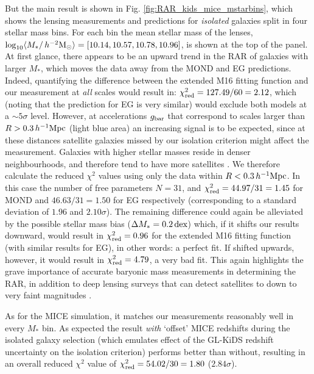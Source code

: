 \documentclass[usenatbib]{mnras}
\newcommand{\hmsun}{\,h^{-2} {\rm M_\odot}}
\newcommand{\hMpc}{\, h^{-1}{\rm{Mpc}} }
\newcommand{\lan}{\langle}
\newcommand{\ran}{\rangle}
\newcommand{\un}[1]{_{\rm #1}}
\newcommand{\dex}{\, {\rm dex}}
\begin{document}
But the main result is shown in Fig. \ref{fig:RAR_kids_mice_mstarbins}, which shows the lensing measurements and predictions for \emph{isolated} galaxies split in four stellar mass bins. For each bin the mean stellar mass of the lenses, $\log_{10}\lan M_*/\hmsun \ran = [10.14, 10.57, 10.78, 10.96]$, is shown at the top of the panel. At first glance, there appears to be an upward trend in the RAR of galaxies with larger $M_*$, which moves the data away from the MOND and EG predictions. Indeed, quantifying the difference between the extended M16 fitting function and our measurement at \emph{all} scales would result in: $\chi\un{red}^2 = 127.49 / 60 = 2.12$, which (noting that the prediction for EG is very similar) would exclude both models at a $\sim5 \sigma$ level. However, at accelerations $g\un{bar}$ that correspond to scales larger than $R > 0.3 \hMpc$ (light blue area) an increasing signal is to be expected, since at these distances satellite galaxies missed by our isolation criterion might affect the measurement. Galaxies with higher stellar masses reside in denser neighbourhoods, and therefore tend to have more satellites \cite[see e.g.]{baldry2006, bolzonella2010, brouwer2016}. We therefore calculate the reduced $\chi^2$ values using only the data within $R < 0.3 \hMpc$. In this case the number of free parameters $N = 31$, and $\chi\un{red}^2 = 44.97 / 31 = 1.45$ for MOND and $46.63 / 31 = 1.50$ for EG respectively (corresponding to a standard deviation of $1.96$ and $2.10\sigma$). The remaining difference could again be alleviated by the possible stellar mass bias ($\Delta M_* = 0.2 \dex$) which, if it shifts our results downward, would result in $\chi\un{red}^2 = 0.96$ for the extended M16 fitting function (with similar results for EG), in other words: a perfect fit. If shifted upwards, however, it would result in $\chi\un{red}^2=4.79$, a very bad fit. This again highlights the grave importance of accurate baryonic mass measurements in determining the RAR, in addition to deep lensing surveys that can detect satellites to down to very faint magnitudes \cite[such as the future Euclid survey;][]{laureijs2011}.

As for the MICE simulation, it matches our measurements reasonably well in every $M_*$ bin. As expected the result \emph{with} `offset' MICE redshifts during the isolated galaxy selection (which emulates effect of the GL-KiDS redshift uncertainty on the isolation criterion) performs better than without, resulting in an overall reduced $\chi^2$ value of $\chi\un{red}^2 = 54.02 / 30 = 1.80$ ($2.84 \sigma$).
\end{document}

